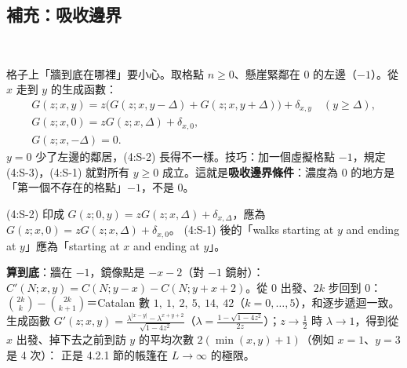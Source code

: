 \subsection{補充：吸收邊界}
\ 

格子上「牆到底在哪裡」要小心。取格點 $n\ge0$、懸崖緊鄰在 $0$ 的左邊（$-1$）。從 $x$ 走到 $y$ 的生成函數：
\begin{gather*}
G(z;x,y)=z\big(G(z;x,y-\Delta)+G(z;x,y+\Delta)\big)+\delta_{x,y}\quad(y\ge\Delta),\tag{4:S-1}\\
G(z;x,0)=zG(z;x,\Delta)+\delta_{x,0},\tag{4:S-2}\\
G(z;x,-\Delta)=0.\tag{4:S-3}
\end{gather*}
$y=0$ 少了左邊的鄰居，(4:S-2) 長得不一樣。技巧：加一個虛擬格點 $-1$，規定 (4:S-3)，(4:S-1) 就對所有 $y\ge0$ 成立。這就是\textbf{吸收邊界條件}：濃度為 0 的地方是「第一個不存在的格點」$-1$，不是 0。
\begin{errbox}[p.~93，(4:S-1)(4:S-2)]
(4:S-2) 印成 $G(z;0,y)=zG(z;x,\Delta)+\delta_{x,\Delta}$，應為 $G(z;x,0)=zG(z;x,\Delta)+\delta_{x,0}$。
(4:S-1) 後的「walks starting at $y$ and ending at $y$」應為「starting at $x$ and ending at $y$」。
\end{errbox}
\textbf{算到底}：牆在 $-1$，鏡像點是 $-x-2$（對 $-1$ 鏡射）：$C'(N;x,y)=C(N;y-x)-C(N;y+x+2)$。從 0 出發、$2k$ 步回到 0：
$\binom{2k}{k}-\binom{2k}{k+1}$＝Catalan 數 $1,\ 1,\ 2,\ 5,\ 14,\ 42$（$k=0,\dots,5$），和逐步遞迴一致。生成函數 $G'(z;x,y)=\frac{\lambda^{|x-y|}-\lambda^{x+y+2}}{\sqrt{1-4z^2}}$（$\lambda=\frac{1-\sqrt{1-4z^2}}{2z}$）；$z\to\frac12$ 時 $\lambda\to1$，得到從 $x$ 出發、掉下去之前到訪 $y$ 的平均次數 $2(\min(x,y)+1)$（例如 $x=1$、$y=3$ 是 4 次）：
正是 4.2.1 節的帳篷在 $L\to\infty$ 的極限。


